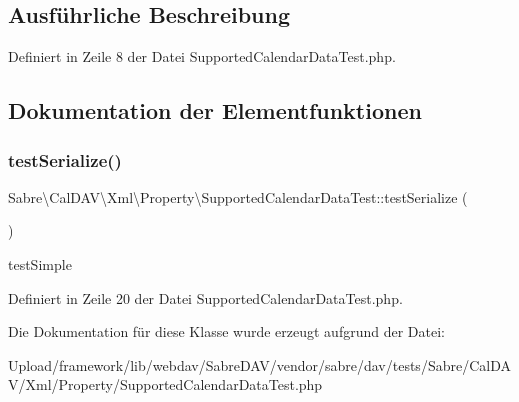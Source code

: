 \subsection{Ausführliche Beschreibung}


Definiert in Zeile 8 der Datei Supported\+Calendar\+Data\+Test.\+php.



\subsection{Dokumentation der Elementfunktionen}
\mbox{\label{class_sabre_1_1_cal_d_a_v_1_1_xml_1_1_property_1_1_supported_calendar_data_test_ab64c4e6e45792a1e0630339367d9470f}} 
\subsubsection{\texorpdfstring{test\+Serialize()}{testSerialize()}}
{\footnotesize\ttfamily Sabre\textbackslash{}\+Cal\+D\+A\+V\textbackslash{}\+Xml\textbackslash{}\+Property\textbackslash{}\+Supported\+Calendar\+Data\+Test\+::test\+Serialize (\begin{DoxyParamCaption}{ }\end{DoxyParamCaption})}

test\+Simple 

Definiert in Zeile 20 der Datei Supported\+Calendar\+Data\+Test.\+php.



Die Dokumentation für diese Klasse wurde erzeugt aufgrund der Datei\+:\begin{DoxyCompactItemize}
\item 
Upload/framework/lib/webdav/\+Sabre\+D\+A\+V/vendor/sabre/dav/tests/\+Sabre/\+Cal\+D\+A\+V/\+Xml/\+Property/Supported\+Calendar\+Data\+Test.\+php\end{DoxyCompactItemize}
